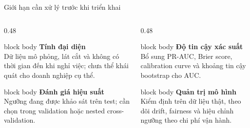 \documentclass[10pt,aspectratio=169]{beamer}
\begin{document}
\begin{frame}{Giới hạn cần xử lý trước khi triển khai}
  \begin{columns}[T,onlytextwidth]
    \begin{column}{0.48\textwidth}
      \begin{beamercolorbox}[sep=0.18cm,rounded=true]{block body}
        \textbf{Tính đại diện}\\
        \small Dữ liệu mô phỏng, lát cắt và không có thời gian đến khi
        nghỉ việc; chưa thể khái quát cho doanh nghiệp cụ thể.
      \end{beamercolorbox}
      \vspace{0.18cm}
      \begin{beamercolorbox}[sep=0.18cm,rounded=true]{block body}
        \textbf{Đánh giá hiệu suất}\\
        \small Ngưỡng đang được khảo sát trên test; cần chọn trong
        validation hoặc nested cross-validation.
      \end{beamercolorbox}
    \end{column}
    \begin{column}{0.48\textwidth}
      \begin{beamercolorbox}[sep=0.18cm,rounded=true]{block body}
        \textbf{Độ tin cậy xác suất}\\
        \small Bổ sung PR-AUC, Brier score, calibration curve và khoảng
        tin cậy bootstrap cho AUC.
      \end{beamercolorbox}
      \vspace{0.18cm}
      \begin{beamercolorbox}[sep=0.18cm,rounded=true]{block body}
        \textbf{Quản trị mô hình}\\
        \small Kiểm định trên dữ liệu thật, theo dõi drift, fairness và
        hiệu chỉnh ngưỡng theo chi phí vận hành.
      \end{beamercolorbox}
    \end{column}
  \end{columns}
\end{frame}
\end{document}
